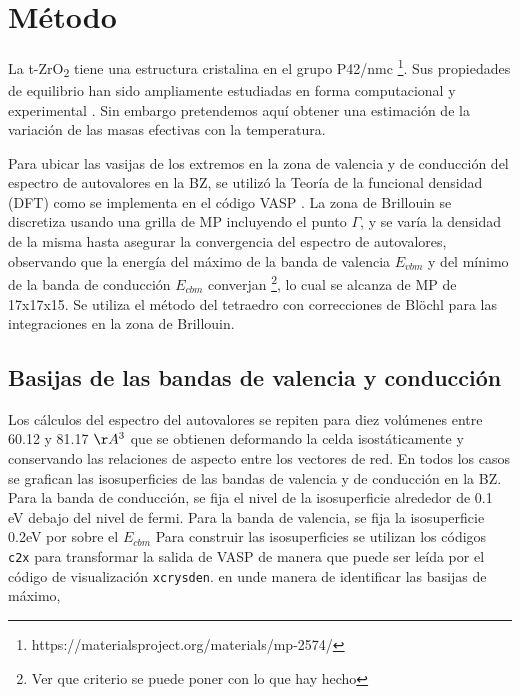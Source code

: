 \section{Método}

La t-ZrO\textsubscript{2} tiene una estructura cristalina en el grupo 
P42/nmc \footnote{https://materialsproject.org/materials/mp-2574/}. Sus 
propiedades de equilibrio han sido ampliamente estudiadas en forma 
computacional y experimental \cite{Milman2009, Garcia2006}. Sin embargo
pretendemos aquí obtener una estimación de la variación de las masas 
efectivas con la temperatura.

Para ubicar las vasijas de los extremos en la zona de valencia y de conducción
del espectro de autovalores en la BZ, se utilizó la Teoría de la funcional densidad (DFT)
\cite{PhysRev.136.B864, PhysRev.140.A1133} como se implementa en el código VASP \cite{doi:10.1002/jcc.21057}.
La zona de Brillouin se discretiza usando una grilla de MP incluyendo el punto $\Gamma$, y se varía la 
densidad de la misma hasta asegurar la convergencia del espectro de autovalores, observando que
la energía del máximo de la banda de valencia $E_{vbm}$ y del mínimo de la banda de conducción 
$E_{cbm}$ converjan \footnote{Ver que criterio se puede poner con lo que hay hecho},
lo cual se alcanza de MP\cite{PhysRevB.13.5188}
de 17x17x15. Se utiliza el método del tetraedro con correcciones de Blöchl\cite{Blochl1994} 
para las integraciones en la zona de Brillouin.

\subsection{Basijas de las bandas de valencia y conducción}
Los cálculos del espectro del autovalores se repiten para diez volúmenes 
entre 60.12 y 81.17 $\AA^3$ que se obtienen deformando la celda isostáticamente y conservando
las relaciones de aspecto entre los vectores de red. En todos los casos se grafican las 
isosuperficies de las bandas de valencia y de conducción en la BZ. Para la banda de conducción, se fija 
el nivel de la isosuperficie alrededor de 0.1 eV debajo del nivel de fermi. Para la banda de valencia, 
se fija la isosuperficie 0.2eV por sobre el $E_{cbm}$
Para construir las isosuperficies se utilizan los códigos \texttt{c2x}\cite{Rutter2018}
para transformar la salida de VASP de manera que puede ser leída por el código de visualización
\texttt{xcrysden}\cite{Kokalj1999}.
en unde manera de identificar las basijas de máximo,

